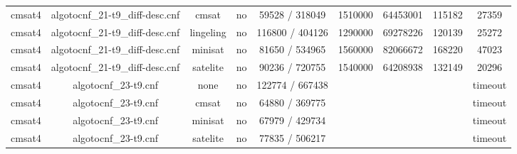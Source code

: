\begin{appendices}
{\begin{table}[p]
\begin{center}
\begin{tabular}{l|cccccccc}
  cmsat4                         & algotocnf\_21-t9\_diff-desc.cnf & cmsat      & no    & 59528 / 318049 & 1510000   & 64453001  & 115182     & 27359 \\ %
  cmsat4                         & algotocnf\_21-t9\_diff-desc.cnf & lingeling  & no    & 116800 / 404126 & 1290000   & 69278226  & 120139     & 25272 \\ %
  cmsat4                         & algotocnf\_21-t9\_diff-desc.cnf & minisat    & no    & 81650 / 534965 & 1560000   & 82066672  & 168220     & 47023 \\ %
  cmsat4                         & algotocnf\_21-t9\_diff-desc.cnf & satelite   & no    & 90236 / 720755 & 1540000   & 64208938  & 132149     & 20296 \\ %
  cmsat4                         & algotocnf\_23-t9.cnf           & none       & no    & 122774 / 667438 &           &           &            & timeout \\ %
  cmsat4                         & algotocnf\_23-t9.cnf           & cmsat      & no    & 64880 / 369775 &           &           &            & timeout \\ %
  cmsat4                         & algotocnf\_23-t9.cnf           & minisat    & no    & 67979 / 429734 &           &           &            & timeout \\ %
  cmsat4                         & algotocnf\_23-t9.cnf           & satelite   & no    & 77835 / 506217 &           &           &            & timeout \\ %
    \end{tabular}
  \end{center}
\end{table}
}
\newpage


\end{appendices}
